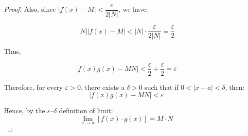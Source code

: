 \documentclass{article}
\begin{document}
\begin{proof}
Also, since \( |f(x) - M| < \dfrac{\varepsilon}{2|N|} \), we have:

\[
|N||f(x) - M| < |N| \cdot \frac{\varepsilon}{2|N|} = \frac{\varepsilon}{2}
\]

Thus,

\[
|f(x)g(x) - MN| 
< \frac{\varepsilon}{2} + \frac{\varepsilon}{2} = \varepsilon
\]

Therefore, for every $\varepsilon > 0$, there exists a $\delta > 0$ such that if $0 < |x - a| < \delta$, then:
\[
|f(x)g(x) - MN| < \varepsilon
\]

Hence, by the $\varepsilon–\delta$ definition of limit:
\[
\lim_{x \to a} [f(x) \cdot g(x)] = M \cdot N
\]



\end{proof}
\end{document}
